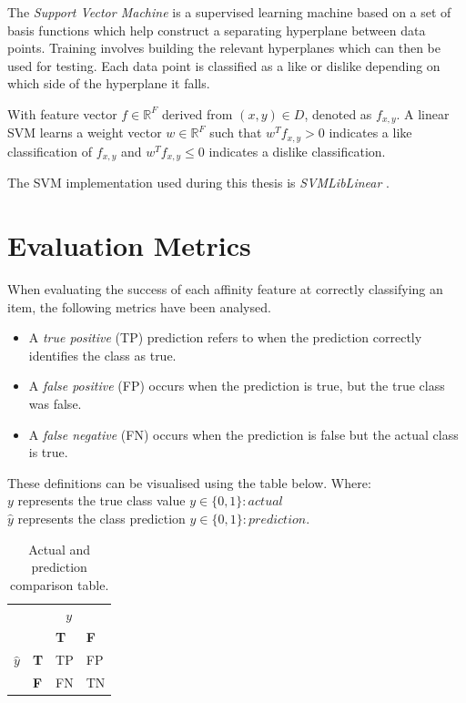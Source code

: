 The \emph{Support Vector Machine} is a supervised learning machine based on a set of basis functions which help construct 
a separating hyperplane between data points. Training involves building the relevant hyperplanes which can then be used for testing. 
Each data point is classified as a like or dislike depending on which side of the hyperplane it falls.

With feature vector $f \in \mathbb{R}^F$ derived from $(x,y) \in D$, denoted as $f_{x,y}$. A linear SVM learns a weight vector $w \in \mathbb{R}^F$
such that $w^T f_{x,y} > 0$ indicates a like classification of $f_{x,y}$ and $w^T f_{x,y} \leq 0$ indicates a dislike classification.

The SVM implementation used during this thesis is \emph{SVMLibLinear} \cite{cjlin}.

\section{Evaluation Metrics}
\label{sec:notation}

When evaluating the success of each affinity feature at correctly classifying an item, the following metrics have been analysed.

\begin{itemize}
\item A \emph{true positive} (TP) prediction refers to when the prediction correctly identifies the class as true. 
\item A \emph{false positive} (FP) occurs when the prediction is true, but the true class was false.
\item A \emph{false negative} (FN) occurs when the prediction is false but the actual class is true.
\end{itemize}

These definitions can be visualised using the table below. Where:
\\
$y$ represents the true class value $y \in \{0,1\} : actual$
\\
$\hat{y}$ represents the class prediction $\hat{y} \in \{0,1\} : prediction$.

\begin{table}[tbh!]
\centering
\begin{tabular}{r|l|l|l|}
\multicolumn{1}{r}{}
 &  \multicolumn{3}{c}{$y$} \\
 \cline{2-4}
& & \textbf{T} & \textbf{F} \\ 
\cline{2-4}
$\hat{y}$ & \textbf{T} & TP & FP \\
\cline{2-4}
& \textbf{F} & FN & TN \\
\cline{2-4}
\end{tabular}
\caption{Actual and prediction comparison table.}
	\label{tab:revpol}
\end{table}

